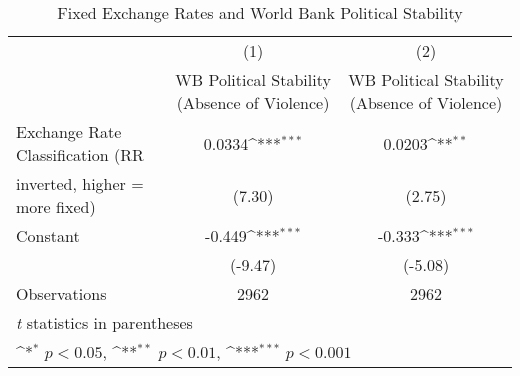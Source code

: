 \begin{table}[htbp]\centering
\def\sym#1{\ifmmode^{#1}\else\(^{#1}\)\fi}
\caption{Fixed Exchange Rates and World Bank Political Stability \label{WBratesalone}}
\begin{tabular}{l*{2}{c}}
\toprule
                                        &\multicolumn{1}{c}{(1)}&\multicolumn{1}{c}{(2)}\\
                                        &\multicolumn{1}{c}{WB Political Stability (Absence of Violence)}&\multicolumn{1}{c}{WB Political Stability (Absence of Violence)}\\
\midrule
Exchange Rate Classification (RR        &   0.0334\sym{***}&   0.0203\sym{**} \\
inverted, higher = more fixed)          &   (7.30)         &   (2.75)         \\
\addlinespace
Constant                                &   -0.449\sym{***}&   -0.333\sym{***}\\
                                        &  (-9.47)         &  (-5.08)         \\
\midrule
Observations                            &     2962         &     2962         \\
\bottomrule
\multicolumn{3}{l}{\footnotesize \textit{t} statistics in parentheses}\\
\multicolumn{3}{l}{\footnotesize \sym{*} \(p<0.05\), \sym{**} \(p<0.01\), \sym{***} \(p<0.001\)}\\
\end{tabular}
\end{table}
